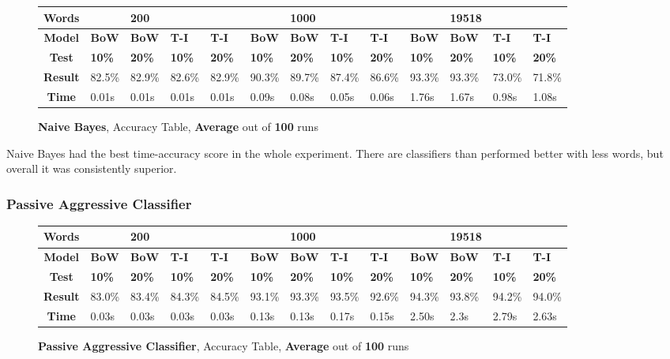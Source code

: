 \documentclass{article}
\begin{document}
	\begin{figure}[!h]
		\begin{tabular}{||c||l|l|l|l||l|l|l|l||l|l|l|l||}
			\hline
			\textbf{Words} &  & \textbf{200} & & & &\textbf{1000} & & & & \textbf{19518} &  & \\ \hline 
			\textbf{Model} & \textbf{BoW} & \textbf{BoW} & \textbf{T-I} & \textbf{T-I} &\textbf{BoW} & \textbf{BoW} & \textbf{T-I} & \textbf{T-I} & \textbf{BoW} & \textbf{BoW} & \textbf{T-I} & \textbf{T-I}\\ \hline
			\textbf{Test} & \textbf{10\%} & \textbf{20\%} & \textbf{10\%} & \textbf{20\%} & \textbf{10\%} & \textbf{20\%} & \textbf{10\%} & \textbf{20\%} & \textbf{10\%} & \textbf{20\%} & \textbf{10\%} & \textbf{20\%} \\ \hline \hline  
			\textbf{Result} & 82.5\% & 82.9\% & 82.6\% & 82.9\% & 90.3\% & 89.7\% & 87.4\% & 86.6\% & 93.3\% & 93.3\% & 73.0\% & 71.8\% \\ \hline 
			\textbf{Time} & 0.01s & 0.01s & 0.01s & 0.01s & 0.09s & 0.08s & 0.05s & 0.06s & 1.76s & 1.67s & 0.98s & 1.08s \\ \hline 
		\end{tabular}
		\caption{\textbf{Naive Bayes}, Accuracy Table, \textbf{Average} out of \textbf{100} runs}
	\end{figure}
	\par Naive Bayes had the best time-accuracy score in the whole experiment. There are classifiers than performed better with less words, but overall it was consistently superior.
    
	\subsubsection{Passive Aggressive Classifier}
	\begin{figure}[H]
		\begin{tabular}{||c||l|l|l|l||l|l|l|l||l|l|l|l||}
			\hline
			\textbf{Words} &  & \textbf{200} & & & &\textbf{1000} & & & & \textbf{19518} &  & \\ \hline 
			\textbf{Model} & \textbf{BoW} & \textbf{BoW} & \textbf{T-I} & \textbf{T-I} &\textbf{BoW} & \textbf{BoW} & \textbf{T-I} & \textbf{T-I} & \textbf{BoW} & \textbf{BoW} & \textbf{T-I} & \textbf{T-I}\\ \hline
			\textbf{Test} & \textbf{10\%} & \textbf{20\%} & \textbf{10\%} & \textbf{20\%} & \textbf{10\%} & \textbf{20\%} & \textbf{10\%} & \textbf{20\%} & \textbf{10\%} & \textbf{20\%} & \textbf{10\%} & \textbf{20\%} \\ \hline \hline  
			\textbf{Result} & 83.0\% & 83.4\% & 84.3\% & 84.5\% & 93.1\% & 93.3\% & 93.5\% & 92.6\% & 94.3\% & 93.8\% & 94.2\% & 94.0\% \\ \hline 
			\textbf{Time} & 0.03s & 0.03s & 0.03s & 0.03s & 0.13s & 0.13s & 0.17s & 0.15s & 2.50s & 2.3s & 2.79s & 2.63s \\ \hline 
		\end{tabular}
		\caption{\textbf{Passive Aggressive Classifier}, Accuracy Table, \textbf{Average} out of \textbf{100} runs}
	\end{figure}    
    
\end{document}
